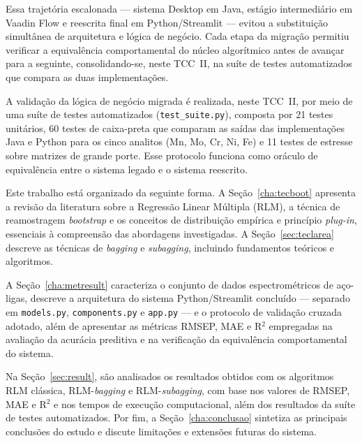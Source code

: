 Essa trajetória escalonada — sistema Desktop em Java, estágio intermediário em Vaadin Flow
e reescrita final em Python/Streamlit — evitou a substituição simultânea de arquitetura e
lógica de negócio. Cada etapa da migração permitiu verificar a equivalência comportamental
do núcleo algorítmico antes de avançar para a seguinte, consolidando-se, neste TCC~II, na
suíte de testes automatizados que compara as duas implementações.

A validação da lógica de negócio migrada é realizada, neste TCC~II, por meio de uma suíte
de testes automatizados (\texttt{test\_suite.py}), composta por 21 testes unitários, 60
testes de caixa-preta que comparam as saídas das implementações Java e Python para os cinco
analitos (Mn, Mo, Cr, Ni, Fe) e 11 testes de estresse sobre matrizes de grande porte. Esse
protocolo funciona como oráculo de equivalência entre o sistema legado e o sistema
reescrito.

Este trabalho está organizado da seguinte forma. A Seção~\ref{cha:tecboot} apresenta a
revisão da literatura sobre a Regressão Linear Múltipla (RLM), a técnica de reamostragem
\textit{bootstrap} e os conceitos de distribuição empírica e princípio \textit{plug-in},
essenciais à compreensão das abordagens investigadas. A Seção~\ref{sec:teclarea} descreve
as técnicas de \textit{bagging} e \textit{subagging}, incluindo fundamentos teóricos e
algoritmos.

A Seção~\ref{cha:metresult} caracteriza o conjunto de dados espectrométricos de aço-ligas,
descreve a arquitetura do sistema Python/Streamlit concluído — separado em \texttt{models.py},
\texttt{components.py} e \texttt{app.py} — e o protocolo de validação cruzada adotado, além
de apresentar as métricas RMSEP, MAE e R$^2$ empregadas na avaliação da acurácia preditiva
e na verificação da equivalência comportamental do sistema.

Na Seção~\ref{sec:result}, são analisados os resultados obtidos com os algoritmos RLM
clássica, RLM-\textit{bagging} e RLM-\textit{subagging}, com base nos valores de RMSEP,
MAE e R$^2$ e nos tempos de execução computacional, além dos resultados da suíte de testes
automatizados. Por fim, a Seção~\ref{cha:conclusao} sintetiza as principais conclusões do
estudo e discute limitações e extensões futuras do sistema.
